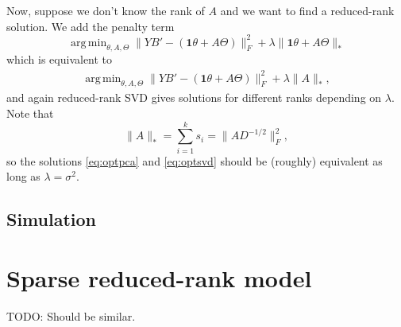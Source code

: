 \documentclass{article}
\DeclareMathOperator*{\argmin}{arg\,min}
\begin{document}
Now, suppose we don't know the rank of $A$ and we want to find a reduced-rank solution. We add the penalty term
\[
\argmin_{\theta, A, \Theta} \| YB' - (\mathbf{1}\theta + A \Theta)\|_F^2 + \lambda\|\mathbf{1}\theta + A \Theta\|_*
\]
which is equivalent to
\begin{align}\label{eq:optsvd}
\argmin_{\theta, A, \Theta} \| YB' - (\mathbf{1}\theta + A \Theta)\|_F^2 + \lambda\|A\|_*,
\end{align}
and again reduced-rank SVD gives solutions for different ranks depending on $\lambda$.
Note that
\[
\|A\|_* = \sum_{i = 1}^k s_i = \| A D^{-1/2} \|_F^2,
\]
so the solutions \eqref{eq:optpca} and \eqref{eq:optsvd} should be (roughly) equivalent as long as $\lambda = \sigma^2$.

\subsection{Simulation}

\section{Sparse reduced-rank model}

TODO: Should be similar.
\end{document}
